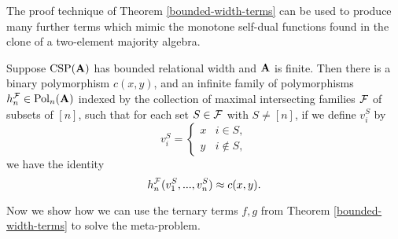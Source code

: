 \documentclass[letterpaper,11pt]{article}
\DeclareMathOperator{\Pol}{Pol}
\DeclareMathOperator{\CSP}{CSP}
\begin{document}
The proof technique of Theorem \ref{bounded-width-terms} can be used to produce many further terms which mimic the monotone self-dual functions found in the clone of a two-element majority algebra.

\begin{thm} Suppose $\CSP(\fA)$ has bounded relational width and $\mathbf{A}$ is finite. Then there is a binary polymorphism $c(x,y)$, and an infinite family of polymorphisms $h_n^{\cF} \in \Pol_n(\fA)$ indexed by the collection of maximal intersecting families $\mathcal{F}$ of subsets of $[n]$, such that for each set $S \in \mathcal{F}$ with $S \ne [n]$, if we define $v_i^S$ by
\[
v_i^S = \begin{cases} x & i \in S,\\ y & i \not\in S,\end{cases}
\]
we have the identity
\[
h_n^{\mathcal{F}}(v_1^S, ..., v_n^S) \approx c(x,y).
\]
\end{thm}

Now we show how we can use the ternary terms $f,g$ from Theorem \ref{bounded-width-terms} to solve the meta-problem.
\end{document}

